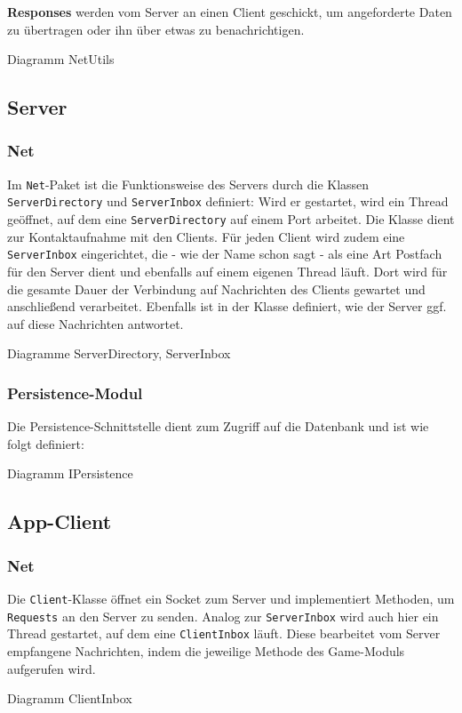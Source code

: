 \textbf{Responses} werden vom Server an einen Client geschickt, um angeforderte Daten zu übertragen oder ihn über etwas zu benachrichtigen. 

Diagramm NetUtils

\subsection{Server}
\subsubsection{Net}
Im \texttt{Net}-Paket ist die Funktionsweise des Servers durch die Klassen \texttt{ServerDirectory} und \texttt{ServerInbox} definiert: Wird er gestartet, wird ein Thread geöffnet, auf dem eine \texttt{ServerDirectory} auf einem Port arbeitet. Die Klasse dient zur Kontaktaufnahme mit den Clients. Für jeden Client wird zudem eine \texttt{ServerInbox} eingerichtet, die - wie der Name schon sagt - als eine Art Postfach für den Server dient und ebenfalls auf einem eigenen Thread läuft. Dort wird für die gesamte Dauer der Verbindung auf Nachrichten des Clients gewartet und anschließend verarbeitet. Ebenfalls ist in der Klasse definiert, wie der Server ggf. auf diese Nachrichten antwortet.

Diagramme ServerDirectory, ServerInbox

\subsubsection{Persistence-Modul}
Die Persistence-Schnittstelle dient zum Zugriff auf die Datenbank und ist wie folgt definiert:

Diagramm IPersistence

\subsection{App-Client}
\subsubsection{Net}
Die \texttt{Client}-Klasse öffnet ein Socket zum Server und implementiert Methoden, um \texttt{Requests} an den Server zu senden. Analog zur \texttt{ServerInbox} wird auch hier ein Thread gestartet, auf dem eine \texttt{ClientInbox} läuft. Diese bearbeitet vom Server empfangene Nachrichten, indem die jeweilige Methode des Game-Moduls aufgerufen wird.

Diagramm ClientInbox

